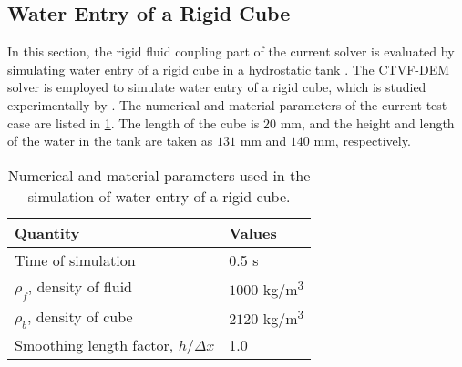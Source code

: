 \FloatBarrier%
\subsection{Water Entry of a Rigid Cube}
\label{sec:falling-solid-in-water}
In this section, the rigid fluid coupling part of the current solver is
evaluated by simulating water entry of a rigid cube in a hydrostatic tank
\parencite{qiu_3d_2017}. The CTVF-DEM solver is employed to simulate water entry of
a rigid cube, which is studied experimentally by \textcite{wu_two-way_2014}. The
numerical and material parameters of the current test case are listed in
\cref{tab:rfc:qiu-falling-cube}. The length of the cube is $20$ mm, and the
height and length of the water in the tank are taken as $131$ mm and $140$ mm,
respectively.
\begin{table}[!ht]
  \centering
  \begin{tabular}[!ht]{ll}
    \toprule
    Quantity & Values\\
    \midrule
    Time of simulation & 0.5 s \\
    $\rho_f$, density of fluid & $1000$ kg/m\textsuperscript{3} \\
    $\rho_b$, density of cube & $2120$ kg/m\textsuperscript{3} \\
    Smoothing length factor, $h/\Delta x$ & 1.0\\
    \bottomrule
  \end{tabular}
  \caption{Numerical and material parameters used in the simulation of water
    entry of a rigid cube.}%
  \label{tab:rfc:qiu-falling-cube}
\end{table}

